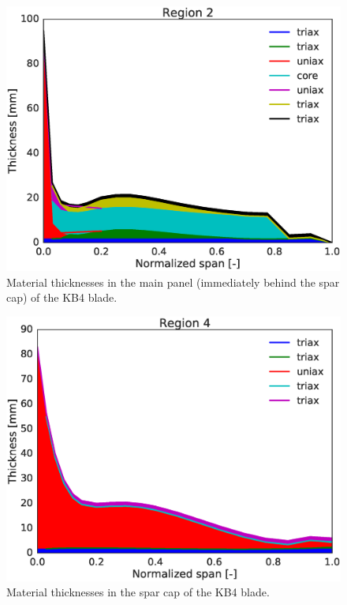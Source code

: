 \begin{figure}[!ht]
\begin{center}
	\includegraphics[width=.85\linewidth]{figures/KB4_laminate_layers_r02.eps}
\end{center}
\caption{Material thicknesses in the main panel (immediately behind the spar cap) of the KB4 blade.}
\label{fig:KB4matstackr02}
\end{figure}

\begin{figure}[!ht]
\begin{center}
	\includegraphics[width=.85\linewidth]{figures/KB4_laminate_layers_r04.eps}
\end{center}
\caption{Material thicknesses in the spar cap of the KB4 blade.}
\label{fig:KB4matstackr04}
\end{figure}

